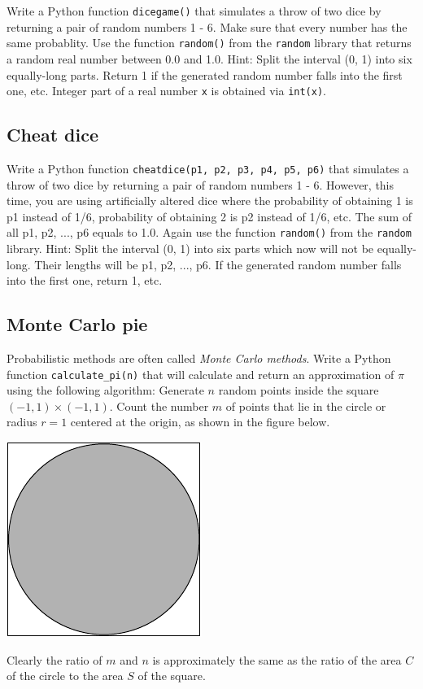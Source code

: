 Write a Python function {\tt dicegame()} that simulates a throw of two
dice by returning a pair of random numbers 1 - 6. Make sure that 
every number has the same probablity. Use the function 
{\tt random()} from the {\tt random} library that returns a random 
real number between 0.0 and 1.0. Hint: Split the interval (0, 1) into six 
equally-long parts. Return 1 if the generated random number falls into the first one, 
etc. Integer part of a real number {\tt x} is obtained via {\tt int(x)}.


\subsection{Cheat dice}

Write a Python function {\tt cheatdice(p1, p2, p3, p4, p5, p6)} that simulates 
a throw of two dice by returning a pair of random numbers 1 - 6. However, this time,
you are using artificially altered dice where the probability of obtaining 1 is p1 
instead of 1/6, probability of obtaining 2 is p2 instead of 1/6, etc. The sum
of all p1, p2, ..., p6 equals to 1.0.
Again use the function {\tt random()} from the {\tt random} library. 
Hint: Split the interval
(0, 1) into six parts which now will not be equally-long. Their lengths will
be p1, p2, ..., p6. If the generated random number falls into the first one, return 1, 
etc.


\subsection{Monte Carlo pie}

Probabilistic methods are often called {\em Monte Carlo methods}. 
Write a Python function {\tt calculate\_pi(n)} that will calculate and return 
an approximation of $\pi$ using the following algorithm: Generate $n$ random points 
inside the square $(-1, 1)\times(-1, 1)$. Count the number $m$ of points that 
lie in the circle or radius $r = 1$ centered at the origin, as shown in the 
figure below.

\begin{center}
\includegraphics[height=0.3\textwidth]{img/prob1.pdf}
\end{center}
\noindent
Clearly the ratio of 
$m$ and $n$ is approximately the same as the ratio of the area $C$ of the circle 
to the area $S$ of the square. 

